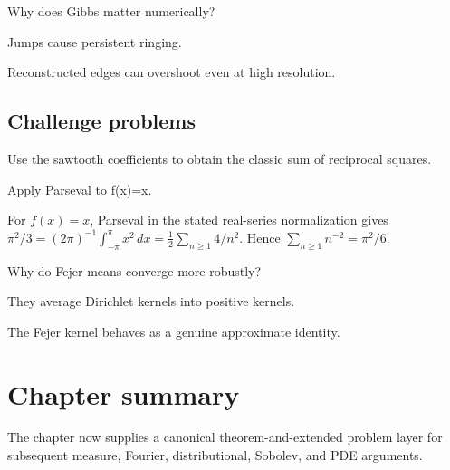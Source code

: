 \begin{exercise}\label{exr:iii09-expand-14}
Why does Gibbs matter numerically?
\end{exercise}
\begin{hint}
Jumps cause persistent ringing.
\end{hint}
\begin{solution}
Reconstructed edges can overshoot even at high resolution.
\end{solution}

\subsection*{Challenge problems}

\begin{exercise}\label{exr:iii09-expand-15}
Use the sawtooth coefficients to obtain the classic sum of reciprocal squares.
\end{exercise}
\begin{hint}
Apply Parseval to f(x)=x.
\end{hint}
\begin{solution}
For $f(x)=x$, Parseval in the stated real-series normalization gives $\pi^2/3=(2\pi)^{-1}\int_{-\pi}^{\pi}x^2\,dx=\tfrac12\sum_{n\ge1}4/n^2$. Hence $\sum_{n\ge1}n^{-2}=\pi^2/6$.
\end{solution}

\begin{exercise}\label{exr:iii09-expand-16}
Why do Fejer means converge more robustly?
\end{exercise}
\begin{hint}
They average Dirichlet kernels into positive kernels.
\end{hint}
\begin{solution}
The Fejer kernel behaves as a genuine approximate identity.
\end{solution}
\section*{Chapter summary}
The chapter now supplies a canonical theorem-and-extended problem layer for subsequent measure, Fourier, distributional, Sobolev, and PDE arguments.
